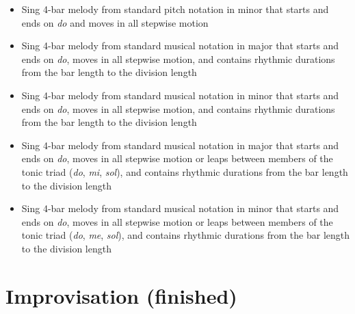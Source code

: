 \begin{itemize}
\item Sing 4-bar melody from standard pitch notation in minor that starts and ends on \emph{do} and moves in all stepwise motion

\item Sing 4-bar melody from standard musical notation in major that starts and ends on \emph{do}, moves in all stepwise motion, and contains rhythmic durations from the bar length to the division length

\item Sing 4-bar melody from standard musical notation in minor that starts and ends on \emph{do}, moves in all stepwise motion, and contains rhythmic durations from the bar length to the division length

\item Sing 4-bar melody from standard musical notation in major that starts and ends on \emph{do}, moves in all stepwise motion or leaps between members of the tonic triad (\emph{do}, \emph{mi}, \emph{sol}), and contains rhythmic durations from the bar length to the division length

\item Sing 4-bar melody from standard musical notation in minor that starts and ends on \emph{do}, moves in all stepwise motion or leaps between members of the tonic triad (\emph{do}, \emph{me}, \emph{sol}), and contains rhythmic durations from the bar length to the division length

\end{itemize}

\section{Improvisation (finished)}
\label{improvisationfinished}

